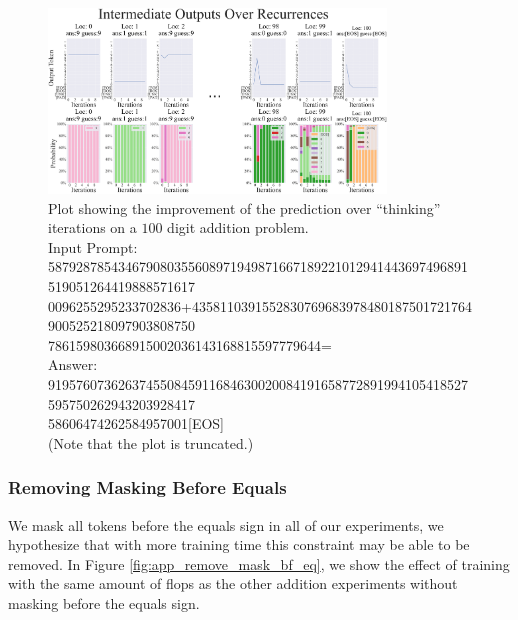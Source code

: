 \documentclass{article}
\begin{document}
\begin{figure}[ht!]
    \centering
    \includegraphics[width=0.8\textwidth]{Figures/plot_thinking.png}
    \caption{
    Plot showing the improvement of the prediction over ``thinking'' iterations on a $100$ digit addition problem.\\
    Input Prompt:\\     587928785434679080355608971949871667189221012941443697496891519051264419888571617\\0096255295233702836+4358110391552830769683978480187501721764900525218097903808750\\786159803668915002036143168815597779644=\\Answer:\\919576073626374550845911684630020084191658772891994105418527595750262943203928417\\58606474262584957001[EOS]\\
    (Note that the plot is truncated.)
    }
    \label{fig:app_thinking_plot}
\end{figure}

\subsubsection{Removing Masking Before Equals}
We mask all tokens before the equals sign in all of our experiments, we hypothesize that with more training time this constraint may be able to be removed.
In Figure \ref{fig:app_remove_mask_bf_eq}, we show the effect of training with the same amount of flops as the other addition experiments without masking before the equals sign.
\end{document}
